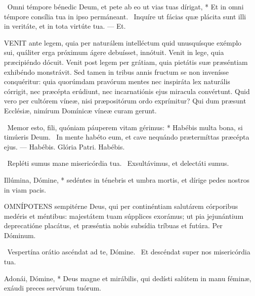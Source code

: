 \R\ Omni témpore bénedic Deum, et pete ab eo ut vias tuas dírigat, * Et in omni témpore consília tua in ipso permáneant. \V\ Inquíre ut fácias quæ plácita sunt illi in veritáte, et in tota virtúte tua. — Et.


\lettrine[lines=2]{V}{ENIT} ante legem, quia per naturálem intelléctum quid unusquísque exémplo sui, quáliter erga próximum ágere debuísset, innótuit. Venit in lege, quia præcipiéndo dócuit. Venit post legem per grátiam, quia pietátis suæ præséntiam exhibéndo monstrávit. Sed tamen in tribus annis fructum se non invenísse conquéritur: quia quorúmdam pravórum mentes nec inspiráta lex naturális córrigit, nec præcépta erúdiunt, nec incarnatiónis ejus miracula convértunt. Quid vero per cultórem víneæ, nisi præpositórum ordo exprímitur? Qui dum præsunt Ecclésiæ, nimírum Domínicæ víneæ curam gerunt.

\R\ Memor esto, fili, quóniam páuperem vitam gérimus: * Habébis multa bona, si timúeris Deum. \V\ In mente habéto eum, et cave nequándo prætermíttas præcépta ejus. — Habébis. Glória Patri. Habébis.


\V\ Repléti sumus mane misericórdia tua. \R\ Exsultávimus, et delectáti sumus.

 Illúmina, Dómine, * sedéntes in ténebris et umbra mortis, et dírige pedes nostros in viam pacis.


\lettrine[lines=2]{O}{MNÍPOTENS} sempitérne Deus, qui per continéntiam salutárem córporibus medéris et méntibus: majestátem tuam súpplices exorámus; ut pia jejunántium deprecatióne placátus, et præséntia nobis subsídia tríbuas et futúra. Per Dóminum.



\V\ Vespertína orátio ascéndat ad te, Dómine. \R\ Et descéndat super nos misericórdia tua.

 Adonái, Dómine, * Deus magne et mirábilis, qui dedísti salútem in manu féminæ, exáudi preces servórum tuórum.


